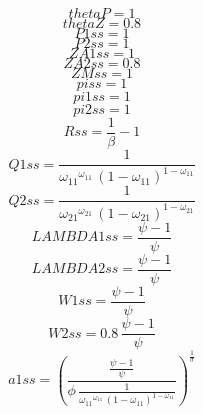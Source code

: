 \begin{dmath*}
thetaP = 1
\end{dmath*}
\begin{dmath*}
thetaZ = 0.8
\end{dmath*}
\begin{dmath*}
P1ss = 1
\end{dmath*}
\begin{dmath*}
P2ss = 1
\end{dmath*}
\begin{dmath*}
ZA1ss = 1
\end{dmath*}
\begin{dmath*}
ZA2ss = 0.8
\end{dmath*}
\begin{dmath*}
ZMss = 1
\end{dmath*}
\begin{dmath*}
piss = 1
\end{dmath*}
\begin{dmath*}
pi1ss = 1
\end{dmath*}
\begin{dmath*}
pi2ss = 1
\end{dmath*}
\begin{dmath*}
Rss = \frac{1}{{{\beta}}}-1
\end{dmath*}
\begin{dmath*}
Q1ss = \frac{1}{{{\omega_{11}}}^{{{\omega_{11}}}}\, \left(1-{{\omega_{11}}}\right)^{1-{{\omega_{11}}}}}
\end{dmath*}
\begin{dmath*}
Q2ss = \frac{1}{{{\omega_{21}}}^{{{\omega_{21}}}}\, \left(1-{{\omega_{21}}}\right)^{1-{{\omega_{21}}}}}
\end{dmath*}
\begin{dmath*}
LAMBDA1ss = \frac{{{\psi}}-1}{{{\psi}}}
\end{dmath*}
\begin{dmath*}
LAMBDA2ss = \frac{{{\psi}}-1}{{{\psi}}}
\end{dmath*}
\begin{dmath*}
W1ss = \frac{{{\psi}}-1}{{{\psi}}}
\end{dmath*}
\begin{dmath*}
W2ss = 0.8\, \frac{{{\psi}}-1}{{{\psi}}}
\end{dmath*}
\begin{dmath*}
a1ss = \left(\frac{\frac{{{\psi}}-1}{{{\psi}}}}{{{\phi}}\, \frac{1}{{{\omega_{11}}}^{{{\omega_{11}}}}\, \left(1-{{\omega_{11}}}\right)^{1-{{\omega_{11}}}}}}\right)^{\frac{1}{{{\sigma}}}}
\end{dmath*}
